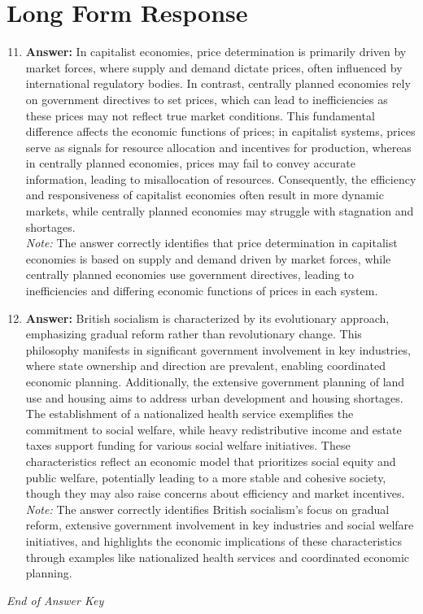 \documentclass[12pt]{article}
\begin{document}
\section*{Long Form Response}
\begin{enumerate}[label=\arabic*.]
\setcounter{enumi}{10}
\item \textbf{Answer:} In capitalist economies, price determination is primarily driven by market forces, where supply and demand dictate prices, often influenced by international regulatory bodies. In contrast, centrally planned economies rely on government directives to set prices, which can lead to inefficiencies as these prices may not reflect true market conditions. This fundamental difference affects the economic functions of prices; in capitalist systems, prices serve as signals for resource allocation and incentives for production, whereas in centrally planned economies, prices may fail to convey accurate information, leading to misallocation of resources. Consequently, the efficiency and responsiveness of capitalist economies often result in more dynamic markets, while centrally planned economies may struggle with stagnation and shortages.
\\ \textit{Note:} The answer correctly identifies that price determination in capitalist economies is based on supply and demand driven by market forces, while centrally planned economies use government directives, leading to inefficiencies and differing economic functions of prices in each system.
\item \textbf{Answer:} British socialism is characterized by its evolutionary approach, emphasizing gradual reform rather than revolutionary change. This philosophy manifests in significant government involvement in key industries, where state ownership and direction are prevalent, enabling coordinated economic planning. Additionally, the extensive government planning of land use and housing aims to address urban development and housing shortages. The establishment of a nationalized health service exemplifies the commitment to social welfare, while heavy redistributive income and estate taxes support funding for various social welfare initiatives. These characteristics reflect an economic model that prioritizes social equity and public welfare, potentially leading to a more stable and cohesive society, though they may also raise concerns about efficiency and market incentives.
\\ \textit{Note:} The answer correctly identifies British socialism's focus on gradual reform, extensive government involvement in key industries and social welfare initiatives, and highlights the economic implications of these characteristics through examples like nationalized health services and coordinated economic planning.
\end{enumerate}

\vfill
\noindent\textit{End of Answer Key}
\end{document}
